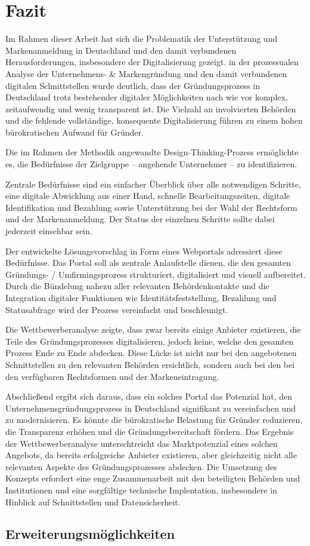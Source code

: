 \newpage

\section{Fazit} \label{fazit}

Im Rahmen dieser Arbeit hat sich die Problematik der Unterstützung und Markenanmeldung in Deutschland und den damit verbundenen Herausforderungen, insbesondere der Digitalisierung gezeigt.
in der prozessualen Analyse der Unternehmens- \& Markengründung und den damit verbundenen digitalen Schnittstellen wurde deutlich, dass der Gründungsprozess in Deutschland trotz bestehender digitaler Möglichkeiten nach wie vor komplex, zeitaufwendig und wenig transparent ist. 
Die Vielzahl an involvierten Behörden und die fehlende vollständige, konsequente Digitalisierung führen zu einem hohen bürokratischen Aufwand für Gründer.

Die im Rahmen der Methodik angewandte Design-Thinking-Prozess ermöglichte es, die Bedürfnisse der Zielgruppe – angehende Unternehmer – zu identifizieren.

Zentrale Bedürfnisse sind ein einfacher Überblick über alle notwendigen Schritte, eine digitale Abwicklung aus einer Hand, schnelle Bearbeitungszeiten, digitale Identifikation und Bezahlung sowie Unterstützung bei der Wahl der Rechtsform und der Markenanmeldung.
Der Status der einzelnen Schritte sollte dabei jederzeit einsehbar sein.

Der entwickelte Lösungsvorschlag in Form eines Webportals adressiert diese Bedürfnisse. Das Portal soll als zentrale Anlaufstelle dienen, die den gesamten Gründungs- / Umfirmingsprozess strukturiert, digitalisiert und visuell aufbereitet.
Durch die Bündelung nahezu  aller relevanten Behördenkontakte und die Integration digitaler Funktionen wie Identitätsfeststellung, Bezahlung und Statusabfrage wird der Prozess vereinfacht und beschleunigt.

Die Wettbewerberanalyse zeigte, dass zwar bereits einige Anbieter existieren, die Teile des Gründungsprozesses digitalisieren, jedoch keine, welche den gesamten Prozess Ende zu Ende abdecken.
Diese Lücke ist nicht nur bei den angebotenen Schnittstellen zu den relevanten Behörden ersichtlich, sondern auch bei den bei den verfügbaren Rechtsformen und der Markeneintragung.

Abschließend ergibt sich daraus, dass ein solches Portal das Potenzial hat, den Unternehmensgründungsprozess in Deutschland signifikant zu vereinfachen und zu modernisieren.
Es könnte die bürokratische Belastung für Gründer reduzieren, die Transparenz erhöhen und die Gründungsbereitschaft fördern.
Das Ergebnis der Wettbewerberanalyse unterschtreicht das Marktpotenzial eines solchen Angebots, da bereits erfolgreiche Anbieter existieren, aber gleichzeitig nicht alle relevanten Aspekte des Gründungsprozesses abdecken.
Die Umsetzung des Konzepts erfordert eine enge Zusammenarbeit mit den beteiligten Behörden und Institutionen und eine sorgfältige technische Implentation, insbesondere in Hinblick auf Schnittstellen und Datensicherheit.


\subsection{Erweiterungsmöglichkeiten} \label{erweiterungsmoeglichkeiten}
